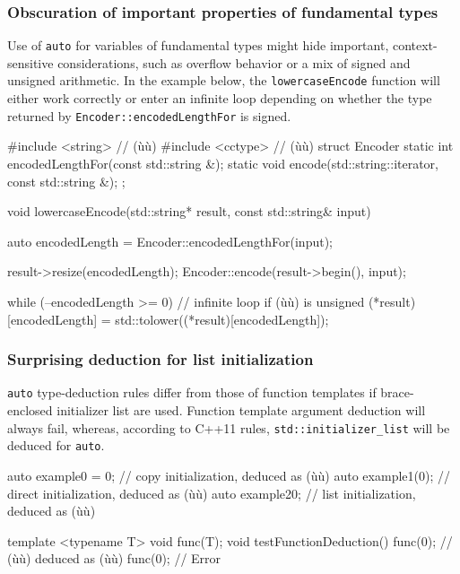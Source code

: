 \subsubsection[Obscuration of important properties of fundamental types]{Obscuration of important properties of fundamental types}\label{obscuration-of-important-properties-of-fundamental-types}

Use of \lstinline!auto! for variables of fundamental types might hide
important, context-sensitive considerations, such as overflow behavior
or a mix of signed and unsigned arithmetic. In the example below, the
\lstinline!lowercaseEncode! function will either work correctly or enter an
infinite loop depending on whether the type returned by
\lstinline!Encoder::encodedLengthFor! is signed.

\begin{emcppshiddenlisting}[emcppsbatch=e20]
#include <string>  // (ù{}ù)
#include <cctype>  // (ù{}ù)
struct Encoder {
    static int encodedLengthFor(const std::string &);
    static void encode(std::string::iterator, const std::string &);
};
\end{emcppshiddenlisting}
\begin{emcppslisting}[emcppsbatch=e20]
void lowercaseEncode(std::string* result, const std::string& input)
{
    auto encodedLength = Encoder::encodedLengthFor(input);

    result->resize(encodedLength);
    Encoder::encode(result->begin(), input);

    while (--encodedLength >= 0)  // infinite loop if (ù{}ù) is unsigned
    {
        (*result)[encodedLength] = std::tolower((*result)[encodedLength]);
    }
}
\end{emcppslisting}
    

\subsubsection[Surprising deduction for list initialization]{Surprising deduction for list initialization}\label{surprising-deduction-for-list-initialization}

\lstinline!auto! type-deduction rules differ from those of function
templates if brace-enclosed initializer list are used. Function template
argument deduction will always fail, whereas, according to C++11 rules,
\lstinline!std::initializer_list! will be deduced for \lstinline!auto!.

\begin{emcppslisting}
auto example0 = 0; // copy initialization, deduced as (ù{}ù)
auto example1(0);  // direct initialization, deduced as (ù{}ù)
auto example2{0};  // list initialization, deduced as (ù{}ù)

template <typename T> void func(T);
void testFunctionDeduction()
{
    func(0);   // (ù{}ù) deduced as (ù{}ù)
    func({0}); // Error
}
\end{emcppslisting}
    
